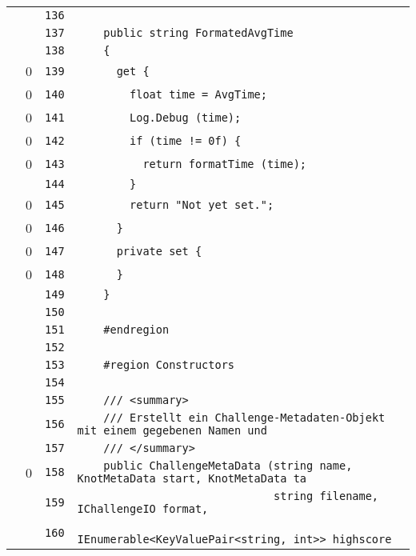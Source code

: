 \documentclass[a4paper,10pt]{article}
\begin{document}
\begin{longtable}[l]{lrrl}
\cellcolor{gray} &  & \verb~136~ & \verb~~\\
\cellcolor{gray} &  & \verb~137~ & \verb~    public string FormatedAvgTime~\\
\cellcolor{gray} &  & \verb~138~ & \verb~    {~\\
\cellcolor{red} & 0 & \verb~139~ & \verb~      get {~\\
\cellcolor{red} & 0 & \verb~140~ & \verb~        float time = AvgTime;~\\
\cellcolor{red} & 0 & \verb~141~ & \verb~        Log.Debug (time);~\\
\cellcolor{red} & 0 & \verb~142~ & \verb~        if (time != 0f) {~\\
\cellcolor{red} & 0 & \verb~143~ & \verb~          return formatTime (time);~\\
\cellcolor{gray} &  & \verb~144~ & \verb~        }~\\
\cellcolor{red} & 0 & \verb~145~ & \verb~        return "Not yet set.";~\\
\cellcolor{red} & 0 & \verb~146~ & \verb~      }~\\
\cellcolor{red} & 0 & \verb~147~ & \verb~      private set {~\\
\cellcolor{red} & 0 & \verb~148~ & \verb~      }~\\
\cellcolor{gray} &  & \verb~149~ & \verb~    }~\\
\cellcolor{gray} &  & \verb~150~ & \verb~~\\
\cellcolor{gray} &  & \verb~151~ & \verb~    #endregion~\\
\cellcolor{gray} &  & \verb~152~ & \verb~~\\
\cellcolor{gray} &  & \verb~153~ & \verb~    #region Constructors~\\
\cellcolor{gray} &  & \verb~154~ & \verb~~\\
\cellcolor{gray} &  & \verb~155~ & \verb~    /// <summary>~\\
\cellcolor{gray} &  & \verb~156~ & \verb~    /// Erstellt ein Challenge-Metadaten-Objekt mit einem gegebenen Namen und ~\\
\cellcolor{gray} &  & \verb~157~ & \verb~    /// </summary>~\\
\cellcolor{red} & 0 & \verb~158~ & \verb~    public ChallengeMetaData (string name, KnotMetaData start, KnotMetaData ta~\\
\cellcolor{gray} &  & \verb~159~ & \verb~                              string filename, IChallengeIO format,~\\
\cellcolor{gray} &  & \verb~160~ & \verb~                              IEnumerable<KeyValuePair<string, int>> highscore~\\

\end{longtable}
\end{document}
